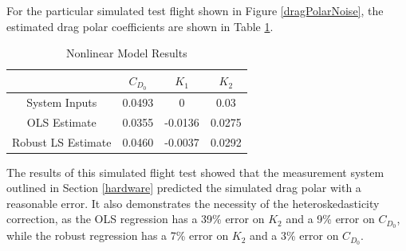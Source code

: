 For the particular simulated test flight shown in Figure \ref{dragPolarNoise}, the estimated drag polar coefficients are shown in Table \ref{simCoeffErrorTable}.

\begin{table}[ht]
\caption{Nonlinear Model Results} %
\centering %
\begin{tabular}{c c c c} %
\hline\hline %
 & $C_{D_0}$ & $K_1$ & $K_2$ \\ [0.5ex] %
\hline %
System Inputs & 0.0493 & 0 & 0.03 \\ %
OLS Estimate & 0.0355 & -0.0136 & 0.0275 \\
Robust LS Estimate & 0.0460 & -0.0037 & 0.0292 \\ [1ex] %
\hline %
\end{tabular}
\label{simCoeffErrorTable} %
\end{table}
The results of this simulated flight test showed that the measurement system outlined in Section \ref{hardware} predicted the simulated drag polar with a reasonable error. It also demonstrates
 the necessity of the heteroskedasticity correction, as the OLS regression has a 39\% error on $K_2$ and a 9\% error on $C_{D_0}$, while the robust regression has a 7\% error on $K_2$ and a 3\% error on $C_{D_0}$.